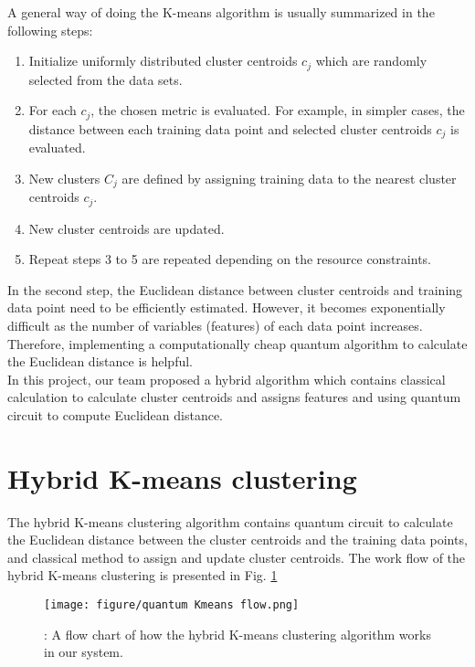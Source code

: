 \documentclass{article}
\begin{document}
A general way of doing the K-means algorithm is usually summarized in the following steps:
\begin{enumerate}
    \item Initialize uniformly distributed cluster centroids $c_j$ which are randomly selected from the data sets.
    \item For each $c_j$, the chosen metric is evaluated. For example, in simpler cases, the distance between each training data point and selected cluster centroids $c_j$ is evaluated.
    \item New clusters $C_j$ are defined by assigning training data to the nearest cluster centroids $c_j$.
    \item New cluster centroids are updated.
    \item Repeat steps 3 to 5 are repeated depending on the resource constraints.
\end{enumerate}
In the second step, the Euclidean distance between cluster centroids and training data point need to be efficiently estimated. However, it becomes exponentially difficult as the number of variables (features) of each data point increases. Therefore, implementing a computationally cheap quantum algorithm to calculate the Euclidean distance is helpful.\\

In this project, our team proposed a hybrid algorithm which contains classical calculation to calculate cluster centroids and assigns features and using quantum circuit to compute Euclidean distance. 

\section{Hybrid K-means clustering}
The hybrid K-means clustering algorithm contains quantum circuit to calculate the Euclidean distance between the cluster centroids and the training data points, and classical method to assign and update cluster centroids. The work flow of the hybrid K-means clustering is presented in Fig. \ref{fig:qkmeans}

\begin{figure}[h]
    \centering
    \texttt{[image: figure/quantum Kmeans flow.png]}
    \caption{: A flow chart of how the hybrid K-means clustering algorithm works in our system.}
    \label{fig:qkmeans}
\end{figure}
\end{document}
